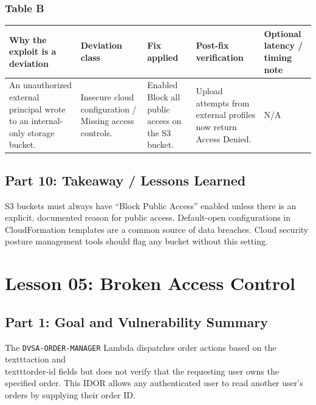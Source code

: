 \documentclass[12pt]{report}
\begin{document}
\subsection*{Table B}
\begin{table}[H]
  \footnotesize
  \centering
  \begin{tabularx}{\textwidth}{|Y|Y|Y|Y|Y|}
    \hline
    \textbf{Why the exploit is a deviation} & \textbf{Deviation class} & \textbf{Fix applied} & \textbf{Post-fix verification} & \textbf{Optional latency / timing note} \\
    \hline
    An unauthorized external principal wrote to an internal-only storage bucket. &
    Insecure cloud configuration / Missing access controls. &
    Enabled Block all public access on the S3 bucket. &
    Upload attempts from external profiles now return Access Denied. &
    N/A \\
    \hline
  \end{tabularx}
\end{table}

\section{Part 10: Takeaway / Lessons Learned}
S3 buckets must always have ``Block Public Access'' enabled unless there is an explicit, documented reason for public access. Default-open configurations in CloudFormation templates are a common source of data breaches. Cloud security posture management tools should flag any bucket without this setting.

\clearpage

\chapter{Lesson 05: Broken Access Control}
 
\section{Part 1: Goal and Vulnerability Summary}
The \texttt{DVSA-ORDER-MANAGER} Lambda dispatches order actions based on the \\texttt{action} and \\texttt{order-id} fields but does not verify that the requesting user owns the specified order. This IDOR allows any authenticated user to read another user's orders by supplying their order ID.
 
\end{document}
